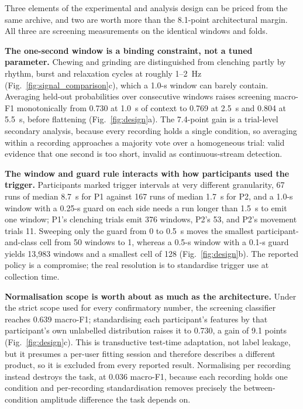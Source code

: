 \documentclass[pdflatex,sn-nature,iicol]{sn-jnl}
\begin{document}
Three elements of the experimental and analysis design can be priced from the same archive, and two are worth more than the 8.1-point architectural margin. All three are screening measurements on the identical windows and folds.

\textbf{The one-second window is a binding constraint, not a tuned parameter.} Chewing and grinding are distinguished from clenching partly by rhythm, burst and relaxation cycles at roughly 1--2~Hz (Fig.~\ref{fig:signal_comparison}c), which a 1.0-s window can barely contain. Averaging held-out probabilities over consecutive windows raises screening macro-F1 monotonically from 0.730 at 1.0~s of context to 0.769 at 2.5~s and 0.804 at 5.5~s, before flattening (Fig.~\ref{fig:design}a). The 7.4-point gain is a trial-level secondary analysis, because every recording holds a single condition, so averaging within a recording approaches a majority vote over a homogeneous trial: valid evidence that one second is too short, invalid as continuous-stream detection.

\textbf{The window and guard rule interacts with how participants used the trigger.} Participants marked trigger intervals at very different granularity, 67 runs of median 8.7~s for P1 against 167 runs of median 1.7~s for P2, and a 1.0-s window with a 0.25-s guard on each side needs a run longer than 1.5~s to emit one window; P1's clenching trials emit 376 windows, P2's 53, and P2's movement trials 11. Sweeping only the guard from 0 to 0.5~s moves the smallest participant-and-class cell from 50 windows to 1, whereas a 0.5-s window with a 0.1-s guard yields 13,983 windows and a smallest cell of 128 (Fig.~\ref{fig:design}b). The reported policy is a compromise; the real resolution is to standardise trigger use at collection time.

\textbf{Normalisation scope is worth about as much as the architecture.} Under the strict scope used for every confirmatory number, the screening classifier reaches 0.639 macro-F1; standardising each participant's features by that participant's own unlabelled distribution raises it to 0.730, a gain of 9.1 points (Fig.~\ref{fig:design}c). This is transductive test-time adaptation, not label leakage, but it presumes a per-user fitting session and therefore describes a different product, so it is excluded from every reported result. Normalising per recording instead destroys the task, at 0.036 macro-F1, because each recording holds one condition and per-recording standardisation removes precisely the between-condition amplitude difference the task depends on.
\end{document}
